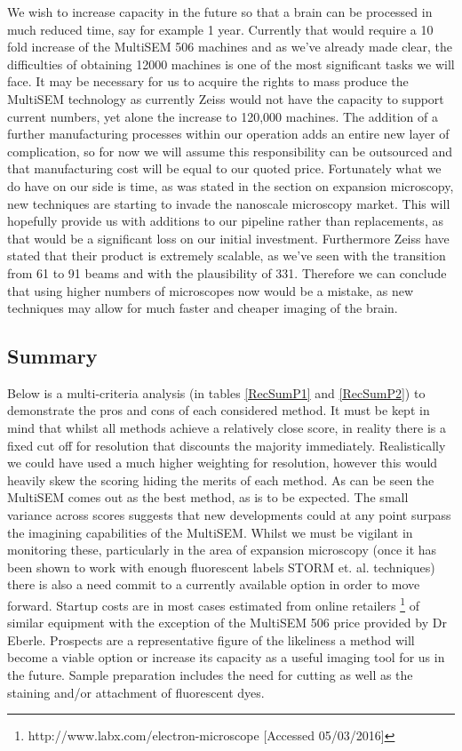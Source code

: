 \documentclass[a4paper, 11pt]{article}
\numberwithin{equation}{section}
\begin{document}
We wish to increase capacity in the future so that a brain can be processed in much reduced time, say for example 1 year. Currently that would require a 10 fold increase of the MultiSEM 506 machines and as we've already made clear, the difficulties of obtaining 12000 machines is one of the most significant tasks we will face. It may be necessary for us to acquire the rights to mass produce the MultiSEM technology as currently Zeiss would not have the capacity to support current numbers, yet alone the increase to 120,000 machines. The addition of a further manufacturing processes within our operation adds an entire new layer of complication, so for now we will assume this responsibility can be outsourced and that manufacturing cost will be equal to our quoted price. 
Fortunately what we do have on our side is time, as was stated in the section on expansion microscopy, new techniques are starting to invade the nanoscale microscopy market. This will hopefully provide us with additions to our pipeline rather than replacements, as that would be a significant loss on our initial investment. Furthermore Zeiss have stated that their product is extremely scalable, as we've seen with the transition from 61 to 91 beams and with the plausibility of 331. Therefore we can conclude that  using higher numbers of microscopes now would be a mistake, as new techniques may allow for much faster and cheaper imaging of the brain.\\


\subsection{Summary}

Below is a multi-criteria analysis (in tables \ref{RecSumP1} and \ref{RecSumP2}) to demonstrate the pros and cons of each considered method. It must be kept in mind that whilst all methods achieve a relatively close score, in reality there is a fixed cut off for resolution that discounts the majority immediately. Realistically we could have used a much higher weighting for resolution, however this would heavily skew the scoring hiding the merits of each method. As can be seen the MultiSEM comes out as the best method, as is to be expected. The small variance across scores suggests that new developments could at any point surpass the imagining capabilities of the MultiSEM. Whilst we must be vigilant in monitoring these, particularly in the area of expansion microscopy (once it has been shown to work with enough fluorescent labels STORM et. al. techniques) there is also a need commit to a currently available option in order to move forward. Startup costs are in most cases estimated from online retailers \footnote{http://www.labx.com/electron-microscope [Accessed 05/03/2016]} of similar equipment with the exception of the MultiSEM 506 price provided by Dr Eberle. Prospects are a representative figure of the likeliness a method will become a viable option or increase its capacity as a useful imaging tool for us in the future. Sample preparation includes the need for cutting as well as the staining and/or attachment of fluorescent dyes. 
\end{document}
